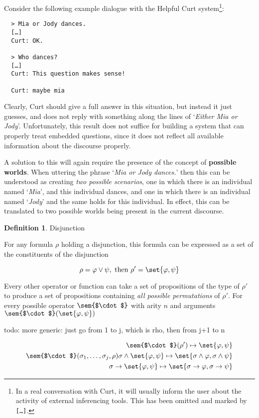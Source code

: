 \documentclass[a4paper]{article}
\newcommand{\term}[1]{\textsf{\textbf{#1}}} %
\newcommand{\code}[1]{\texttt{#1}} %
\newcommand{\pn}{\textsf} %
\newcommand{\example}[1]{`\textit{#1}'} %
\newcommand{\curt}{\pn{Curt}}
\theoremstyle{remark}
\theoremstyle{remark}
\theoremstyle{definition}
\newtheorem{definition}[thm]{Definition}
\theoremstyle{definition}
\begin{document}
Consider the following example dialogue with the \pn{Helpful Curt}
system\footnote{In a real conversation with \curt, it will usually inform the
user about the activity of external inferencing tools. This has been omitted and
marked by \code{[…]}.}:

\begin{verbatim}
  > Mia or Jody dances.
  […]
  Curt: OK.

  > Who dances?
  […]
  Curt: This question makes sense!

  Curt: maybe mia
\end{verbatim}

Clearly, \curt{} should give a full answer in this situation, but instead it
just guesses, and does not reply with something along the lines of \example{Either
Mia or Jody}. Unfortunately, this result does not suffice for building a system
that can properly treat embedded questions, since it does not reflect all
available information about the discourse properly.

A solution to this will again require the presence of the concept of
\term{possible worlds}. When uttering the phrase \example{Mia or Jody dances.}
then this can be understood as creating \emph{two possible scenarios}, one in
which there is an individual named \example{Mia}, and this individual dances,
and one in which there is an individual named \example{Jody} and the same holds
for this individual. In effect, this can be translated to two possible worlds
being present in the current discourse.

\begin{definition}
  Disjunction

  For any formula $\rho$ holding a disjunction, this formula can be expressed as a set
  of the constituents of the disjunction

  \[ \rho = \varphi \vee \psi, \textrm{ then } \rho' = \set{\varphi, \psi}\]

  Every other operator or function can take a set of propositions of the type of
  $\rho'$ to produce a set of propositions containing \emph{all possible
  permutations} of $\rho'$. For every possible operator $\sem{$\cdot$}$ with arity
  $n$ and arguments $\sem{$\cdot$}(\set{\varphi,\psi})$

  todo: more generic: just go from 1 to j, which is rho, then from j+1 to n

  \begin{eqnarray*}
    \sem{$\cdot$}(\rho') \mapsto \set{\varphi,\psi}\\
    \sem{$\cdot$}(\sigma_1,\dots,\sigma_j,\rho )

    \sigma \wedge \set{\varphi, \psi} \mapsto \set{\sigma\wedge\varphi,\sigma\wedge\psi}\\
    \sigma \to \set{\varphi, \psi} \mapsto \set{\sigma\to\varphi,\sigma\to\psi}\\
  \end{eqnarray*}
\end{definition}
\end{document}
